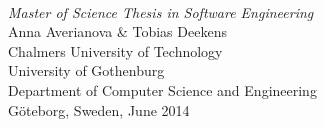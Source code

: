 \begin{titlepage}


\mbox{}
\vfill
\addtolength{\voffset}{2cm}

\begin{flushleft}
  { \\[0.5cm]
  \emph{\Large Master of Science Thesis in Software Engineering} \\[.8cm]

  {\huge 
    Anna Averianova \& 
    Tobias Deekens
  }\\[.8cm]

  {\Large Chalmers University of Technology \\
    University of Gothenburg
  } \\
     Department of Computer Science and Engineering \\
     Göteborg, Sweden,  June 2014
  } 
\end{flushleft}

\end{titlepage}
\ClearShipoutPicture

\newpage
\clearpage
\thispagestyle{empty}

